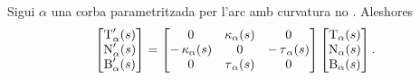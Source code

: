 \documentclass[../Apunts.tex]{subfiles}
\begin{document}
	\begin{theorem}
		\label{thm:fórmules de Frenet per corbes parametritzades per l'arc}
		Sigui \(\alpha\) una corba parametritzada per l'arc amb curvatura no \nulla{}. Aleshores
		\[\begin{bmatrix}
			\operatorname{T}'_{\alpha}(s) \\
			\operatorname{N}'_{\alpha}(s) \\
			\operatorname{B}'_{\alpha}(s)
		\end{bmatrix}=
		\begin{bmatrix}
			0 & \operatorname{\kappa}_{\alpha}(s) & 0 \\
			-\operatorname{\kappa}_{\alpha}(s) & 0 & -\operatorname{\tau}_{\alpha}(s) \\
			0 & \operatorname{\tau}_{\alpha}(s) & 0
		\end{bmatrix}
		\begin{bmatrix}
			\operatorname{T}_{\alpha}(s) \\
			\operatorname{N}_{\alpha}(s) \\
			\operatorname{B}_{\alpha}(s)
		\end{bmatrix}.\]
	\end{theorem}
\end{document}
